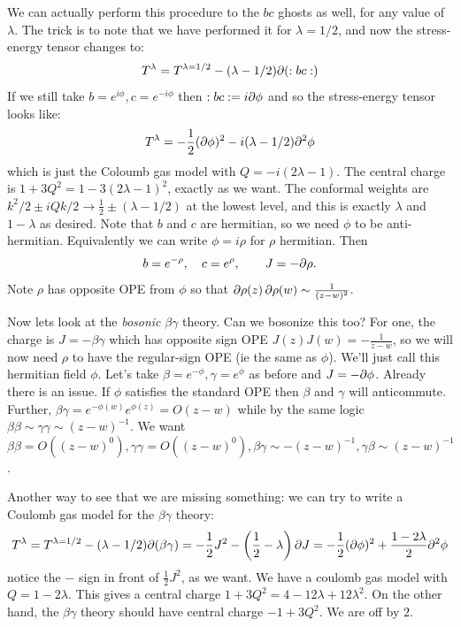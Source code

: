 \documentclass[11pt]{article}
\begin{document}
\begin{enumerate}
	We can actually perform this procedure to the $b c$ ghosts as well, for any value of $\lambda$. The trick is to note that we have performed it for $\lambda = 1/2$, and now the stress-energy tensor changes to:
	\[
		T^{\lambda} = T^{\lambda=1/2} - (\lambda-1/2) \partial(:b c:)
	\]
	If we still take $b = e^{i \phi}, c=e^{-i\phi}$ then $:b c: = i \partial \phi$ and so the stress-energy tensor looks like:
	\[
		T^\lambda = - \frac12 (\partial \phi)^2 - i (\lambda-1/2) \partial^2 \phi
	\]
	which is just the Coloumb gas model with $Q = - i (2 \lambda-1)$. The central charge is $1 + 3 Q^2 = 1 - 3 (2 \lambda-1)^2$, exactly as we want. The conformal weights are $k^2/2 \pm i Q k/2 \to \frac12 \pm (\lambda-1/2)$ at the lowest level, and this is exactly $\lambda$ and $1-\lambda$ as desired. Note that $b$ and $c$ are hermitian, so we need $\phi$ to be anti-hermitian. Equivalently we can write $\phi = i \rho$ for $\rho$ hermitian. Then
	\[
		b = e^{-\rho}, \quad c = e^{\rho}, \qquad J = - \partial \rho.
	\]
	Note $\rho$ has opposite OPE from $\phi$ so that $\partial \rho(z)\, \partial \rho(w) \sim \frac{1}{(z-w)^2}$.
	
	Now lets look at the \emph{bosonic} $\beta \gamma$ theory. Can we bosonize this too? For one, the charge is $J = - \beta \gamma$ which has opposite sign OPE $J(z) J(w) = -\frac{1}{z-w}$, so we will now need $\rho$ to have the regular-sign OPE (ie the same as $\phi$). We'll just call this hermitian field $\phi$. Let's take $\beta = e^{-\phi}, \gamma = e^{\phi}$ as before and $J = - \partial \phi$. Already there is an issue. If $\phi$ satisfies the standard OPE then $\beta$ and $\gamma$ will anticommute. Further, $\beta \gamma = e^{-\phi(w)} e^{\phi(z)} = O(z-w)$ while by the same logic $\beta \beta \sim \gamma \gamma \sim (z-w)^{-1}$. We want $\beta \beta = O((z-w)^0), \gamma \gamma = O((z-w)^0), \beta \gamma \sim -(z-w)^{-1}, \gamma \beta \sim (z-w)^{-1}$. 
	
	Another way to see that we are missing something: we can try to write a Coulomb gas model for the $\beta \gamma$ theory:
	\[
		T^\lambda = T^{\lambda = 1/2} - (\lambda-1/2) \partial (\beta \gamma) = - \frac{1}{2} J^2 - \left(\frac12 - \lambda\right) \partial J = - \frac12 (\partial \phi)^2 + \frac{1 - 2 \lambda}{2} \partial^2 \phi
	\]
	notice the $-$ sign in front of $\frac12 J^2$, as we want. We have a coulomb gas model with $Q = 1 -2 \lambda$. This gives a central charge $1 + 3Q^2 = 4 - 12 \lambda + 12 \lambda^2$. On the other hand, the $\beta \gamma$ theory should have central charge $-1 + 3Q^2$. We are off by $2$.
	

\end{enumerate}
\end{document}
